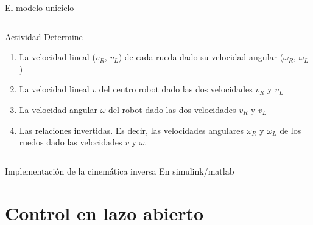 \documentclass[presentation,aspectratio=169]{beamer}
\begin{document}
\begin{frame}[label={sec:org2bf68b7}]{El modelo uniciclo}
\begin{columns}
\begin{column}{0.6\columnwidth}
\alert{Actividad} Determine

\begin{enumerate}
\item La velocidad lineal (\(v_R\), \(v_L\)) de cada rueda dado su velocidad angular (\(\omega_R\), \(\omega_L\))

\item La velocidad lineal \(v\) del centro robot dado las dos velocidades \(v_R\) y \(v_L\)

\item La velocidad angular \(\omega\) del robot dado las dos velocidades \(v_R\) y \(v_L\)

\item Las relaciones invertidas. Es decir, las velocidades angulares \(\omega_R\) y \(\omega_L\) de los ruedos dado las velocidades \(v\) y \(\omega\).
\end{enumerate}
\end{column}
\end{columns}
\end{frame}


\begin{frame}[label={sec:org283db1f}]{Implementación de la cinemática inversa}
En simulink/matlab
\end{frame}


\section{Control en lazo abierto}
\label{sec:org2a1d956}
\end{document}
